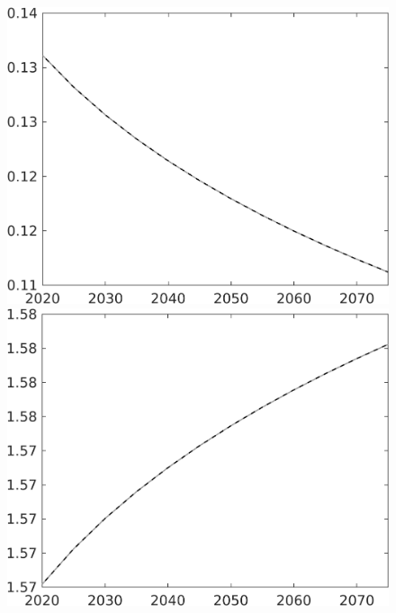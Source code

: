 \documentclass[12pt]{article}
\begin{document}
\begin{figure}[h!!]
\begin{minipage}[]{0.32\textwidth}
	\end{minipage}	
	\begin{minipage}[]{0.32\textwidth}
		\includegraphics[width=1\textwidth]{../../codding_model/own_basedOnFried/optimalPol_010922_revision/figures/all_13Sept22/CompTaul_LFBAU_Reg0_pee_spillover0_nsk1_xgr1_knspil0_sep1_countec0_GovRev0_etaa0.79_lgd0.png}
	\end{minipage}	
	\begin{minipage}[]{0.32\textwidth}
		\includegraphics[width=1\textwidth]{../../codding_model/own_basedOnFried/optimalPol_010922_revision/figures/all_13Sept22/CompTaul_LFBAU_Reg0_pn_spillover0_nsk1_xgr1_knspil0_sep1_countec0_GovRev0_etaa0.79_lgd0.png}

\end{minipage}
\end{figure}
\end{document}
